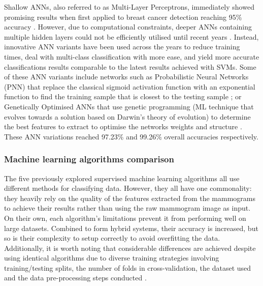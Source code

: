 Shallow ANNs, also referred to as Multi-Layer Perceptrons, immediately showed promising results when first applied to breast cancer detection reaching 95\% accuracy \citep{Wu1993}. However, due to computational constraints, deeper ANNs containing multiple hidden layers could not be efficiently utilised until recent years \citep{Litjens2017}. Instead, innovative ANN variants have been used across the years to reduce training times, deal with multi-class classification with more ease, and yield more accurate classifications results comparable to the latest results achieved with SVMs. Some of these ANN variants include networks such as Probabilistic Neural Networks (PNN) that replace the classical sigmoid activation function with an exponential function to find the training sample that is closest to the testing sample \citep{Osareh2010}; or Genetically Optimised ANNs that use genetic programming (ML technique that evolves towards a solution based on Darwin's theory of evolution) to determine the best features to extract to optimise the networks weights and structure \citep{Bhardwaj2015}. These ANN variations reached 97.23\% and 99.26\% overall accuracies respectively.



\subsubsection{Machine learning algorithms comparison}

The five previously explored supervised machine learning algorithms all use different methods for classifying data. However, they all have one commonality: they heavily rely on the quality of the features extracted from the mammograms to achieve their results rather than using the raw mammogram image as input. On their own, each algorithm's limitations prevent it from performing well on large datasets. Combined to form hybrid systems, their accuracy is increased, but so is their complexity to setup correctly to avoid overfitting the data. Additionally, it is worth noting that considerable differences are achieved despite using identical algorithms due to diverse training strategies involving training/testing splits, the number of folds in cross-validation, the dataset used and the data pre-processing steps conducted \citep{Yue2018}.\\

